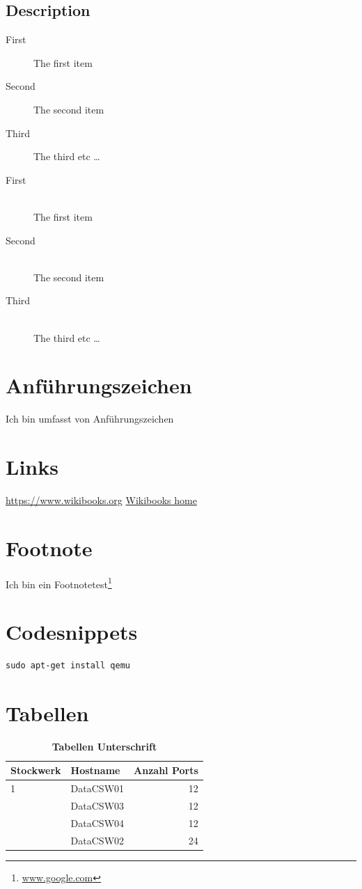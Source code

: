 \subsection{Description}
\begin{description}
  \item[First] The first item
  \item[Second] The second item
  \item[Third] The third etc \ldots
\end{description}
\begin{description}
  \item[First] \hfill \\
  The first item
  \item[Second] \hfill \\
  The second item
  \item[Third] \hfill \\
  The third etc \ldots
\end{description}

\section{Anführungszeichen}
Ich bin umfasst von \flqq Anführungszeichen \frqq{ }

\section{Links}
\url{https://www.wikibooks.org}
\href{https://www.wikibooks.org}{Wikibooks home}

\section{Footnote}
  Ich bin ein Footnotetest\footnote{\url{www.google.com}}

\section{Codesnippets}
\begin{lstlisting}
sudo apt-get install qemu
\end{lstlisting}

\section{Tabellen}

\begin{table}[htb]
\centering
    \begin{tabular}{@{} l l r@{}}\toprule
    {Stockwerk} & {Hostname} & {Anzahl Ports}\\ \midrule
    1 & DataCSW01 & 12\\ \addlinespace
    & DataCSW03 & 12\\ \addlinespace
    & DataCSW04 & 12\\ \addlinespace
    2& DataCSW02 & 24\\
    \bottomrule
    \end{tabular}
\caption{\textbf{Tabellen Unterschrift}}
\end{table}

